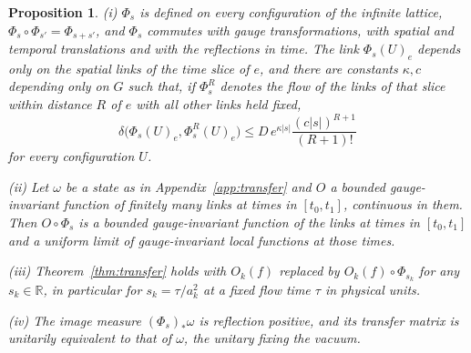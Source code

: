 \documentclass[11pt]{amsart}
\newtheorem{proposition}[theorem]{Proposition}
\theoremstyle{definition}
\theoremstyle{remark}
\numberwithin{equation}{section}
\newcommand{\R}{\mathbb{R}}
\begin{document}
\begin{proposition}\label{prop:spatialflow}
\textup{(i)} $\Phi_s$ is defined on every configuration of the infinite
lattice, $\Phi_s\circ\Phi_{s'}=\Phi_{s+s'}$, and $\Phi_s$ commutes with gauge
transformations, with spatial and temporal translations and with the
reflections in time. The link $\Phi_s(U)_e$ depends only on the spatial links
of the time slice of $e$, and there are constants $\kappa,c$ depending only on
$G$ such that, if $\Phi^{R}_s$ denotes the flow of the links of that slice
within distance $R$ of $e$ with all other links held fixed,
\[
\delta\bigl(\Phi_s(U)_e,\Phi^R_s(U)_e\bigr)\le D\,e^{\kappa|s|}
\frac{(c|s|)^{R+1}}{(R+1)!}
\]
for every configuration $U$.

\textup{(ii)} Let $\omega$ be a state as in Appendix~\ref{app:transfer} and
$O$ a bounded gauge-invariant function of finitely many links at times in
$[t_0,t_1]$, continuous in them. Then $O\circ\Phi_s$ is a bounded
gauge-invariant function of the links at times in $[t_0,t_1]$ and a uniform
limit of gauge-invariant local functions at those times.

\textup{(iii)} Theorem~\ref{thm:transfer} holds with $O_k(f)$ replaced by
$O_k(f)\circ\Phi_{s_k}$ for any $s_k\in\R$, in particular for $s_k=\tau/a_k^2$
at a fixed flow time $\tau$ in physical units.

\textup{(iv)} The image measure $(\Phi_s)_*\omega$ is reflection positive, and
its transfer matrix is unitarily equivalent to that of $\omega$, the unitary
fixing the vacuum.
\end{proposition}
\end{document}
